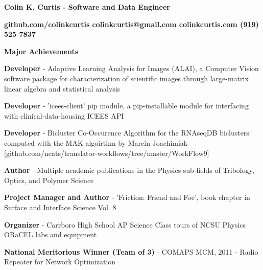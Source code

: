 \documentclass[letterpaper,final]{memoir}
\newcommand{\LargeSep}{\vspace{1.3em}}
\newcommand{\Sep}{\vspace{1.0em}}
\newcommand{\SmallSep}{\vspace{0.4em}}
\newcommand{\CVSection}[1]
	{\LARGE\textbf{#1}\par
	\SmallSep\normalsize}
\newcommand{\CVItem}[1]
	{\textbf{\color{Blue} #1}}
\newcommand\tab[1][1cm]{\hspace*{#1}}
\begin{document}
\Huge \bfseries {\color{Blue} Colin K. Curtis - Software and Data Engineer}

\Sep
\normalsize\normalfont

\CVItem  \tab \bfseries {github.com/colinkcurtis \tab colinkcurtis@gmail.com  \tab colinkcurtis.com \tab  (919) 525 7837} 

\LargeSep





\notoserif \CVSection{Major Achievements}
\normalfont

\Sep

\begin{compactitem}

    \item \textbf{Developer} - Adaptive Learning Analysis for Images (ALAI), a Computer Vision software package for characterization of scientific images through large-matrix linear algebra and statistical analysis
    \SmallSep

    \item \textbf{Developer} - 'icees-client' pip module, a pip-installable module for interfacing with clinical-data-housing ICEES API
    \SmallSep

    \item \textbf{Developer} - Bicluster Co-Occurence Algorithm for the RNAseqDB biclusters computed with the MAK algoirthm by Marcin Joachimiak [github.com/ncats/translator-workflows/tree/master/WorkFlow9]
    \SmallSep

    \item \textbf{Author} - Multiple academic publications in the Physics sub-fields of Tribology, Optics, and Polymer Science
    \SmallSep

    \item \textbf{Project Manager and Author} - 'Friction: Friend and Foe', book chapter in Surface and Interface Science Vol. 8
    \SmallSep

    \item \textbf{Organizer} - Carrboro High School AP Science Class tours of NCSU Physics ORaCEL labs and equipment
    \SmallSep

    \item \textbf{National Meritorious Winner (Team of 3)} - COMAPS MCM, 2011 - Radio Repeater for Network Optimization
    \SmallSep



\end{compactitem}
\end{document}

